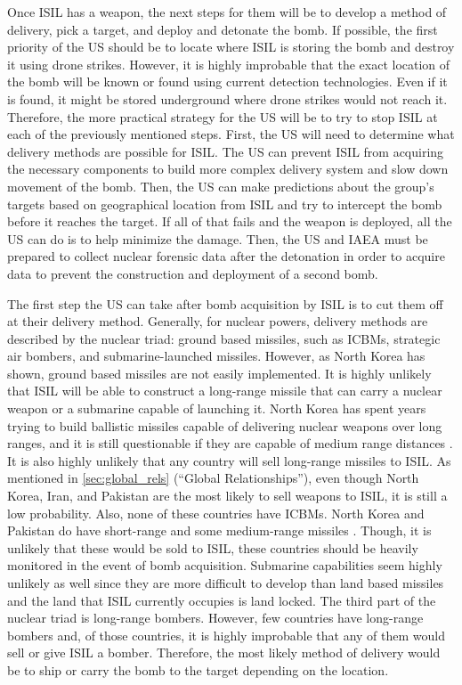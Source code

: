 \documentclass{report}
\begin{document}
Once ISIL has a weapon, the next steps for them will be to develop a method of delivery, pick a target, and deploy and detonate the bomb.  If possible, the first priority of the US should be to locate where ISIL is storing the bomb and destroy it using drone strikes.  However, it is highly improbable that the exact location of the bomb will be known or found using current detection technologies.  Even if it is found, it might be stored underground where drone strikes would not reach it.  Therefore, the more practical strategy for the US will be to try to stop ISIL at each of the previously mentioned steps.   First, the US will need to determine what delivery methods are possible for ISIL.  The US can prevent ISIL from acquiring the necessary components to build more complex delivery system and slow down movement of the bomb.  Then, the US can make predictions about the group’s targets based on geographical location from ISIL and try to intercept the bomb before it reaches the target.  If all of that fails and the weapon is deployed, all the US can do is to help minimize the damage.  Then, the US and IAEA must be prepared to collect nuclear forensic data after the detonation in order to acquire data to prevent the construction and deployment of a second bomb.

The first step the US can take after bomb acquisition by ISIL is to cut them off at their delivery method.  Generally, for nuclear powers, delivery methods are described by the nuclear triad: ground based missiles, such as ICBMs, strategic air bombers, and submarine-launched missiles.  However, as North Korea has shown, ground based missiles are not easily implemented.  It is highly unlikely that ISIL will be able to construct a long-range missile that can carry a nuclear weapon or a submarine capable of launching it.  North Korea has spent years trying to build ballistic missiles capable of delivering nuclear weapons over long ranges, and it is still questionable if they are capable of medium range distances \cite{Gladstone2015}.  It is also highly unlikely that any country will sell long-range missiles to ISIL.  As mentioned in \autoref{sec:global_rels} (\enquote{Global Relationships}), even though North Korea, Iran, and Pakistan are the most likely to sell weapons to ISIL, it is still a low probability.  Also, none of these countries have ICBMs. North Korea and Pakistan do have short-range and some medium-range missiles \cite{Gladstone2015,NuclearThreatInitiative2014}.  Though, it is unlikely that these would be sold to ISIL, these countries should be heavily monitored in the event of bomb acquisition.  Submarine capabilities seem highly unlikely as well since they are more difficult to develop than land based missiles and the land that ISIL currently occupies is land locked.  The third part of the nuclear triad is long-range bombers.  However, few countries have long-range bombers and, of those countries, it is highly improbable that any of them would sell or give ISIL a bomber.  Therefore, the most likely method of delivery would be to ship or carry the bomb to the target depending on the location. 
\end{document}
